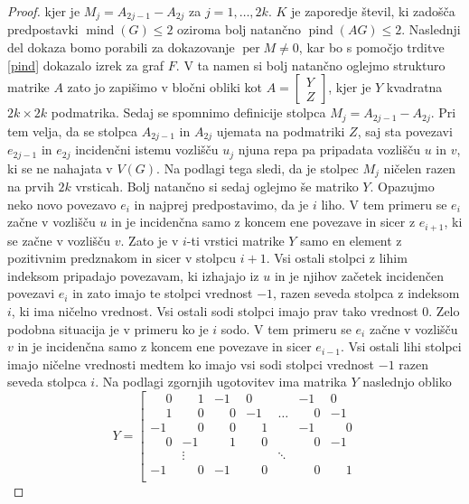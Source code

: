 \documentclass[12pt,a4paper,twoside]{article}
\theoremstyle{definition} %
\theoremstyle{plain} %
\numberwithin{equation}{section}  %
\newcommand{\Z}{\mathbb Z}
\DeclareMathOperator{\per}{per}
\DeclareMathOperator{\mind}{mind}
\DeclareMathOperator{\pind}{pind}
\begin{document}
\begin{proof}
kjer je $M_j = A_{2j - 1} - A_{2j}$ za $j=1, \ldots, 2k$. $K$ je zaporedje števil, ki zadošča predpostavki $\mind(G) \le 2$ oziroma bolj natančno $\pind(AG) \le 2$. Naslednji del dokaza bomo porabili za dokazovanje $\per M \neq 0$, kar bo s pomočjo trditve \ref{pind} dokazalo izrek za graf $F$. V ta namen si bolj natančno oglejmo strukturo matrike $A$ zato jo zapišimo v bločni obliki kot $ A=\begin{bmatrix}Y \\Z \end{bmatrix}  $, kjer je $Y$ kvadratna $2k \times 2k$ podmatrika. Sedaj se spomnimo definicije stolpca $M_j = A_{2j - 1} - A_{2j}$. Pri tem velja, da se stolpca $A_{2j - 1}$ in $A_{2j}$ ujemata na podmatriki $Z$, saj sta povezavi $e_{2j - 1}$ in $e_{2j}$ incidenčni istemu vozlišču $u_j$ njuna repa pa pripadata vozlišču $u$ in $v$, ki se ne nahajata v $V(G)$. Na podlagi tega sledi, da je stolpec $M_j$ ničelen razen na prvih $2k$ vrsticah. Bolj natančno si sedaj oglejmo še matriko $Y$. Opazujmo neko novo povezavo $e_i$ in najprej predpostavimo, da je $i$ liho. V tem primeru se  $e_i$ začne v vozlišču $u$ in je incidenčna samo z koncem ene povezave in sicer z $e_{i+1}$, ki se začne v vozlišču $v$. Zato je v $i$-ti vrstici matrike $Y$ samo en element z pozitivnim predznakom in sicer v stolpcu $i+1$. Vsi ostali stolpci z lihim indeksom pripadajo povezavam, ki izhajajo iz $u$ in je njihov začetek incidenčen povezavi $e_i$ in zato imajo te stolpci vrednost $-1$, razen seveda stolpca z indeksom $i$, ki ima ničelno vrednost. Vsi ostali sodi stolpci imajo prav tako vrednost $0$. Zelo podobna situacija je v primeru ko je $i$ sodo. V tem primeru se $e_i$ začne v vozlišču $v$ in je incidenčna samo z koncem ene povezave in sicer $e_{i-1}$. Vsi ostali lihi stolpci imajo ničelne vrednosti medtem ko imajo vsi sodi stolpci vrednost $-1$ razen seveda stolpca $i$. Na podlagi zgornjih ugotovitev ima matrika $Y$ naslednjo obliko
$$ Y= \left[ \begin{matrix} 
\phantom{-}0 & \phantom{-}1 & -1 & 0 &  & -1 & 0 \\
 \phantom{-}1 &\phantom{-} 0 & \phantom{-}0 & -1 & \ldots  & \phantom{-}0 & -1 \\ 
-1 & \phantom{-}0 & \phantom{-}0 & \phantom{-}1 &  & -1 & \phantom{-}0 \\ 
\phantom{-}0 & -1 & \phantom{-}1 & \phantom{-}0 &  & \phantom{-}0 & -1 \\ 
 & \vdots &  &  & \ddots &  &  \\ 
-1 & \phantom{-}0 & -1 & \phantom{-}0 &  & \phantom{-}0 & \phantom{-}1 \\ 

\end{matrix}$$
\end{proof}
\end{document}
